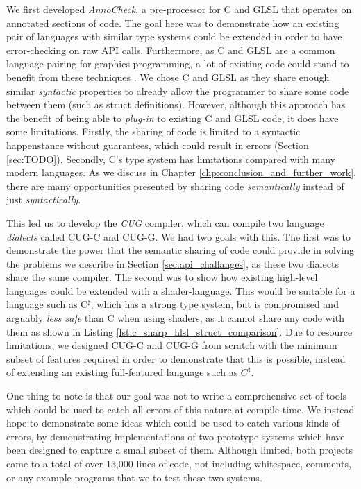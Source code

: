 \documentclass[a4paper,12pt,twoside,openright]{report}
\begin{document}
We first developed \textit{AnnoCheck}, a pre-processor for C and GLSL that
operates on annotated sections of code. The goal here was to demonstrate how an
existing pair of languages with similar type systems could be extended in order
to have error-checking on raw API calls. Furthermore, as C and GLSL are a
common language pairing for graphics programming, a lot of existing code could
stand to benefit from these techniques \cite{TODO}. We chose C and GLSL as they
share enough similar \textit{syntactic} properties to already allow the
programmer to share some code between them (such as struct definitions).
However, although this approach has the benefit of being able to
\textit{plug-in} to existing C and GLSL code, it does have some limitations.
Firstly, the sharing of code is limited to a syntactic happenstance without
guarantees, which could result in errors (Section \ref{sec:TODO}). Secondly,
C's type system has limitations compared with many modern languages. As we
discuss in Chapter \ref{chp:conclusion_and_further_work}, there are many
opportunities presented by sharing code \textit{semantically} instead of just
\textit{syntactically}.


This led us to develop the \textit{CUG} compiler, which can compile two
language \textit{dialects} called CUG-C and CUG-G. We had two goals with this.
The first was to demonstrate the power that the semantic sharing of code could
provide in solving the problems we describe in Section
\ref{sec:api_challanges}, as these two dialects share the same compiler. The
second was to show how existing high-level languages could be extended with a
shader-language. This would be suitable for a language such as C$^\sharp$,
which has a strong type system, but is compromised and arguably \textit{less
safe} than C when using shaders, as it cannot share any code with them as shown
in Listing \ref{lst:c_sharp_hlsl_struct_comparison}. Due to resource
limitations, we designed CUG-C and CUG-G from scratch with the minimum subset
of features required in order to demonstrate that this is possible, instead of
extending an existing full-featured language such as $C^\sharp$.

One thing to note is that our goal was not to write a comprehensive set of
tools which could be used to catch all errors of this nature at compile-time.
We instead hope to demonstrate some ideas which could be used to catch various
kinds of errors, by demonstrating implementations of two prototype systems
which have been designed to capture a small subset of them. Although limited,
both projects came to a total of over 13,000 lines of code, not including
whitespace, comments, or any example programs that we to test these two
systems.
\end{document}
